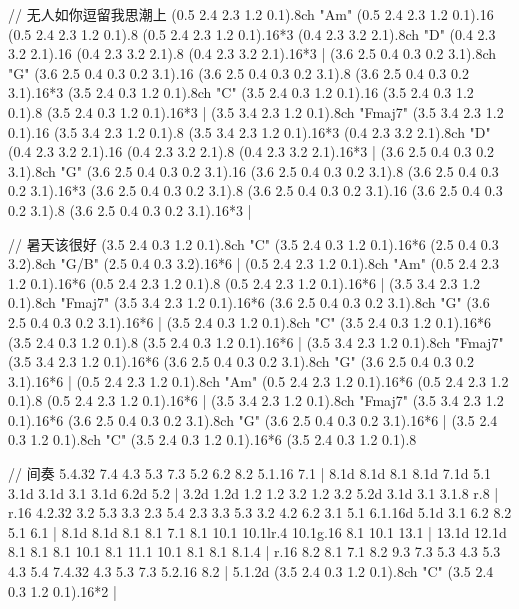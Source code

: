// 无人如你逗留我思潮上
(0.5 2.4 2.3 1.2 0.1).8{ch "Am"}
(0.5 2.4 2.3 1.2 0.1).16
(0.5 2.4 2.3 1.2 0.1).8
(0.5 2.4 2.3 1.2 0.1).16*3
(0.4 2.3 3.2 2.1).8{ch "D"}
(0.4 2.3 3.2 2.1).16
(0.4 2.3 3.2 2.1).8
(0.4 2.3 3.2 2.1).16*3 |
(3.6 2.5 0.4 0.3 0.2 3.1).8{ch "G"}
(3.6 2.5 0.4 0.3 0.2 3.1).16
(3.6 2.5 0.4 0.3 0.2 3.1).8
(3.6 2.5 0.4 0.3 0.2 3.1).16*3
(3.5 2.4 0.3 1.2 0.1).8{ch "C"}
(3.5 2.4 0.3 1.2 0.1).16
(3.5 2.4 0.3 1.2 0.1).8
(3.5 2.4 0.3 1.2 0.1).16*3 |
(3.5 3.4 2.3 1.2 0.1).8{ch "Fmaj7"}
(3.5 3.4 2.3 1.2 0.1).16
(3.5 3.4 2.3 1.2 0.1).8
(3.5 3.4 2.3 1.2 0.1).16*3
(0.4 2.3 3.2 2.1).8{ch "D"}
(0.4 2.3 3.2 2.1).16
(0.4 2.3 3.2 2.1).8
(0.4 2.3 3.2 2.1).16*3 |
(3.6 2.5 0.4 0.3 0.2 3.1).8{ch "G"}
(3.6 2.5 0.4 0.3 0.2 3.1).16
(3.6 2.5 0.4 0.3 0.2 3.1).8
(3.6 2.5 0.4 0.3 0.2 3.1).16*3
(3.6 2.5 0.4 0.3 0.2 3.1).8
(3.6 2.5 0.4 0.3 0.2 3.1).16
(3.6 2.5 0.4 0.3 0.2 3.1).8
(3.6 2.5 0.4 0.3 0.2 3.1).16*3 |

// 暑天该很好
(3.5 2.4 0.3 1.2 0.1).8{ch "C"}
(3.5 2.4 0.3 1.2 0.1).16*6
(2.5 0.4 0.3 3.2).8{ch "G/B"}
(2.5 0.4 0.3 3.2).16*6 |
(0.5 2.4 2.3 1.2 0.1).8{ch "Am"}
(0.5 2.4 2.3 1.2 0.1).16*6
(0.5 2.4 2.3 1.2 0.1).8
(0.5 2.4 2.3 1.2 0.1).16*6 |
(3.5 3.4 2.3 1.2 0.1).8{ch "Fmaj7"}
(3.5 3.4 2.3 1.2 0.1).16*6
(3.6 2.5 0.4 0.3 0.2 3.1).8{ch "G"}
(3.6 2.5 0.4 0.3 0.2 3.1).16*6 |
(3.5 2.4 0.3 1.2 0.1).8{ch "C"}
(3.5 2.4 0.3 1.2 0.1).16*6
(3.5 2.4 0.3 1.2 0.1).8
(3.5 2.4 0.3 1.2 0.1).16*6 |
(3.5 3.4 2.3 1.2 0.1).8{ch "Fmaj7"}
(3.5 3.4 2.3 1.2 0.1).16*6
(3.6 2.5 0.4 0.3 0.2 3.1).8{ch "G"}
(3.6 2.5 0.4 0.3 0.2 3.1).16*6 |
(0.5 2.4 2.3 1.2 0.1).8{ch "Am"}
(0.5 2.4 2.3 1.2 0.1).16*6
(0.5 2.4 2.3 1.2 0.1).8
(0.5 2.4 2.3 1.2 0.1).16*6 |
(3.5 3.4 2.3 1.2 0.1).8{ch "Fmaj7"}
(3.5 3.4 2.3 1.2 0.1).16*6
(3.6 2.5 0.4 0.3 0.2 3.1).8{ch "G"}
(3.6 2.5 0.4 0.3 0.2 3.1).16*6 |
(3.5 2.4 0.3 1.2 0.1).8{ch "C"}
(3.5 2.4 0.3 1.2 0.1).16*6
(3.5 2.4 0.3 1.2 0.1).8

// 间奏
5.4.32 7.4 4.3 5.3 7.3 5.2 6.2 8.2 5.1.16 7.1 |
8.1{d} 8.1{d} 8.1 8.1{d} 7.1{d} 5.1
3.1{d} 3.1{d} 3.1 3.1{d} 6.2{d} 5.2 |
3.2{d} 1.2{d} 1.2 1.2 3.2 1.2 3.2 5.2{d} 3.1{d} 3.1 3.1.8 r.8 |
r.16 4.2.32 3.2 5.3 3.3 2.3 5.4 2.3 3.3 5.3 3.2 4.2 6.2 3.1 5.1
6.1.16{d} 5.1{d} 3.1 6.2 8.2 5.1 6.1 |
8.1{d} 8.1{d} 8.1 8.1 7.1 8.1 10.1
10.1{lr}.4 10.1{g}.16 8.1 10.1 13.1 |
13.1{d} 12.1{d} 8.1 8.1 8.1 10.1 8.1 11.1 10.1 8.1 8.1 8.1.4 |
r.16 8.2 8.1 7.1 8.2 9.3 7.3 5.3 4.3 5.3 4.3 5.4 7.4.32 4.3 5.3 7.3 5.2.16 8.2 |
5.1.2{d}
(3.5 2.4 0.3 1.2 0.1).8{ch "C"}
(3.5 2.4 0.3 1.2 0.1).16*2 |

